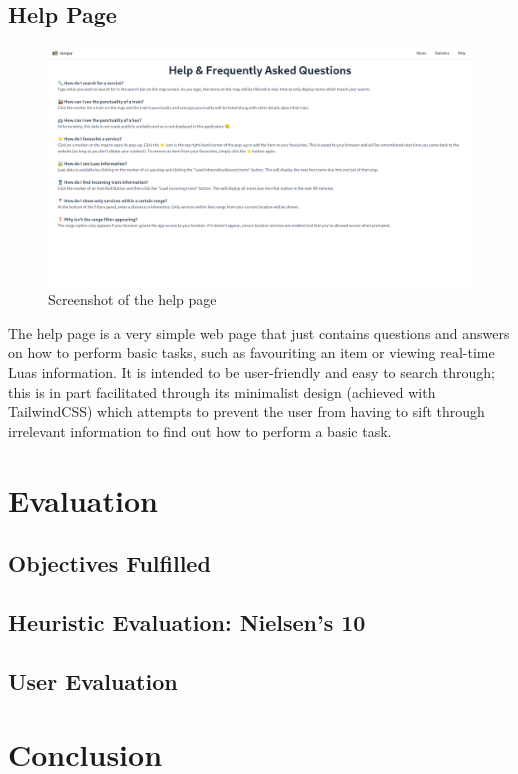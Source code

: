 \documentclass[a4paper,11pt]{report}
\begin{document}
\section{Help Page}
\begin{figure}[H]
    \centering
    \includegraphics[width=\textwidth]{./images/helppage.png}
    \caption{Screenshot of the help page}
\end{figure}

The help page is a very simple web page that just contains questions and answers on how to perform basic tasks, such as favouriting an item or viewing real-time Luas information.
It is intended to be user-friendly and easy to search through; 
this is in part facilitated through its minimalist design (achieved with TailwindCSS) which attempts to prevent the user from having to sift through irrelevant information to find out how to perform a basic task.

\chapter{Evaluation}
\section{Objectives Fulfilled}
\section{Heuristic Evaluation: Nielsen's 10}
\section{User Evaluation}

\chapter{Conclusion}









\printbibliography
\end{document}

